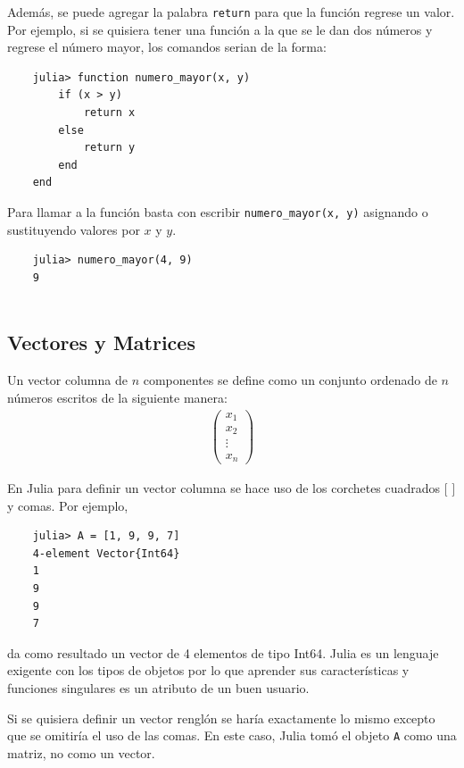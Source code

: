 Además, se puede agregar la palabra \texttt{return} para que la función regrese un valor. Por ejemplo, si se quisiera tener una función a la que se le dan dos números y regrese el número mayor, los comandos serian de la forma:

\begin{verbatim}
	julia> function numero_mayor(x, y)
		if (x > y)
			return x
		else
			return y
		end
	end
\end{verbatim}


Para llamar a la función basta con escribir \texttt{numero\_mayor(x, y)} asignando o sustituyendo valores por $x$ y $y$. 

\begin{verbatim}
	julia> numero_mayor(4, 9)
	9
	
\end{verbatim}

\subsection{Vectores y Matrices}

Un vector columna de $n$ componentes se define como un conjunto ordenado de $n$ números escritos de la siguiente manera:
\begin{equation*}
    \begin{aligned}
    \begin{pmatrix}
    x_1 \\ 
    x_2 \\
    \vdots \\
    x_n
    \end{pmatrix} 
    \end{aligned}
\end{equation*}

En \textsf{Julia} para definir un vector columna se hace uso de los corchetes cuadrados $[$ $]$ y comas. Por ejemplo, 

\begin{verbatim}
	julia> A = [1, 9, 9, 7]
	4-element Vector{Int64}
	1
	9
	9
	7
\end{verbatim}

\noindent da como resultado un vector de 4 elementos de tipo Int64. \textsf{Julia} es un lenguaje exigente con los tipos de objetos por lo que aprender sus características y funciones singulares es un atributo de un buen usuario. 

Si se quisiera definir un vector renglón se haría exactamente lo mismo excepto que se omitiría el uso de las comas. En este caso, \textsf{Julia} tomó el objeto \texttt{A} como una matriz, no como un vector. 

